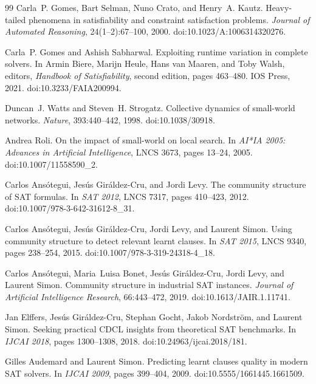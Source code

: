 \documentclass[11pt]{article}
\begin{document}
\begin{thebibliography}{99}
Carla~P. Gomes, Bart Selman, Nuno Crato, and Henry~A. Kautz.
\newblock Heavy-tailed phenomena in satisfiability and constraint satisfaction problems.
\newblock \emph{Journal of Automated Reasoning}, 24(1--2):67--100, 2000.
\newblock doi:10.1023/A:1006314320276.

Carla~P. Gomes and Ashish Sabharwal.
\newblock Exploiting runtime variation in complete solvers.
\newblock In Armin Biere, Marijn Heule, Hans van Maaren, and Toby Walsh, editors,
\emph{Handbook of Satisfiability}, second edition, pages 463--480.
IOS Press, 2021.
\newblock doi:10.3233/FAIA200994.

Duncan~J. Watts and Steven~H. Strogatz.
\newblock Collective dynamics of small-world networks.
\newblock \emph{Nature}, 393:440--442, 1998.
\newblock doi:10.1038/30918.

Andrea Roli.
\newblock On the impact of small-world on local search.
\newblock In \emph{AI*IA 2005: Advances in Artificial Intelligence}, LNCS 3673, pages 13--24, 2005.
\newblock doi:10.1007/11558590\_2.

Carlos Ansótegui, Jesús Giráldez-Cru, and Jordi Levy.
\newblock The community structure of SAT formulas.
\newblock In \emph{SAT 2012}, LNCS 7317, pages 410--423, 2012.
\newblock doi:10.1007/978-3-642-31612-8\_31.

Carlos Ansótegui, Jesús Giráldez-Cru, Jordi Levy, and Laurent Simon.
\newblock Using community structure to detect relevant learnt clauses.
\newblock In \emph{SAT 2015}, LNCS 9340, pages 238--254, 2015.
\newblock doi:10.1007/978-3-319-24318-4\_18.

Carlos Ansótegui, Maria~Luisa Bonet, Jesús Giráldez-Cru, Jordi Levy, and Laurent Simon.
\newblock Community structure in industrial SAT instances.
\newblock \emph{Journal of Artificial Intelligence Research}, 66:443--472, 2019.
\newblock doi:10.1613/JAIR.1.11741.

Jan Elffers, Jesús Giráldez-Cru, Stephan Gocht, Jakob Nordström, and Laurent Simon.
\newblock Seeking practical CDCL insights from theoretical SAT benchmarks.
\newblock In \emph{IJCAI 2018}, pages 1300--1308, 2018.
\newblock doi:10.24963/ijcai.2018/181.

Gilles Audemard and Laurent Simon.
\newblock Predicting learnt clauses quality in modern SAT solvers.
\newblock In \emph{IJCAI 2009}, pages 399--404, 2009.
\newblock doi:10.5555/1661445.1661509.


\end{thebibliography}
\end{document}
